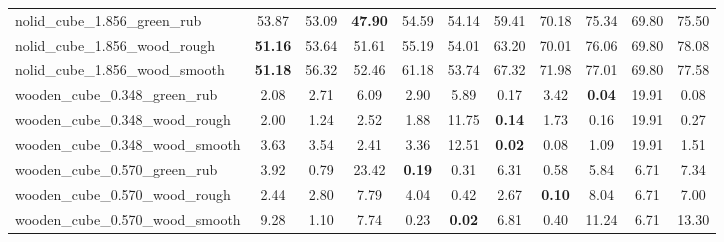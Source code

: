 \begin{table}[H]
{\begin{tabular}{l cccccccccc}
        nolid\_cube\_1.856\_green\_rub & 53.87 & 53.09 & \textbf{47.90} & 54.59 & 54.14 & 59.41 & 70.18 & 75.34 & 69.80 & 75.50 \\
        nolid\_cube\_1.856\_wood\_rough & \textbf{51.16} & 53.64 & 51.61 & 55.19 & 54.01 & 63.20 & 70.01 & 76.06 & 69.80 & 78.08 \\
        nolid\_cube\_1.856\_wood\_smooth & \textbf{51.18} & 56.32 & 52.46 & 61.18 & 53.74 & 67.32 & 71.98 & 77.01 & 69.80 & 77.58 \\
        wooden\_cube\_0.348\_green\_rub & 2.08 & 2.71 & 6.09 & 2.90 & 5.89 & 0.17 & 3.42 & \textbf{0.04} & 19.91 & 0.08 \\
        wooden\_cube\_0.348\_wood\_rough & 2.00 & 1.24 & 2.52 & 1.88 & 11.75 & \textbf{0.14} & 1.73 & 0.16 & 19.91 & 0.27 \\
        wooden\_cube\_0.348\_wood\_smooth & 3.63 & 3.54 & 2.41 & 3.36 & 12.51 & \textbf{0.02} & 0.08 & 1.09 & 19.91 & 1.51 \\
        wooden\_cube\_0.570\_green\_rub & 3.92 & 0.79 & 23.42 & \textbf{0.19} & 0.31 & 6.31 & 0.58 & 5.84 & 6.71 & 7.34 \\
        wooden\_cube\_0.570\_wood\_rough & 2.44 & 2.80 & 7.79 & 4.04 & 0.42 & 2.67 & \textbf{0.10} & 8.04 & 6.71 & 7.00 \\
        wooden\_cube\_0.570\_wood\_smooth & 9.28 & 1.10 & 7.74 & 0.23 & \textbf{0.02} & 6.81 & 0.40 & 11.24 & 6.71 & 13.30 \\
        \bottomrule
    \end{tabular}
    }
\end{table}



\vspace{1cm}

\clearpage


